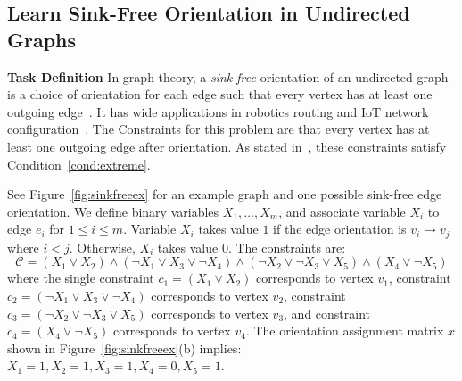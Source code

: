 \subsection{Learn Sink-Free Orientation in Undirected Graphs}
\textbf{Task Definition} In graph theory, a \textit{sink-free} orientation of an undirected graph is a choice of orientation for each edge such that every vertex has at least one outgoing edge~\cite{DBLP:journals/combinatorics/CohnPP02}. It has wide applications in robotics routing and IoT network configuration~\cite{takahashi2009communication}.  The Constraints for this problem are that every vertex has at least one outgoing edge after orientation. As stated in~\cite{DBLP:journals/jacm/GuoJL19}, these constraints satisfy Condition~\ref{cond:extreme}.

{See Figure~\ref{fig:sinkfreeex} for an example graph and one possible sink-free edge orientation. We define binary variables $X_1,\ldots, X_m$, and associate variable $X_i$ to edge $e_i$ for $1\le i\le m$. Variable $X_i$ takes value $1$ if the edge orientation is $v_i\to v_j$ where $i<j$. Otherwise, $X_i$ takes value $0$. The constraints are:}
\begin{equation*}
\mathcal{C}=(X_1\vee X_2)\wedge(\neg X_1\vee X_3\vee\neg X_4)\wedge(\neg X_2\vee\neg X_3\vee X_5)\wedge(X_4\vee \neg X_5)
\end{equation*}
{where the single constraint  $c_1=(X_1\vee X_2)$ corresponds to vertex $v_1$, constraint $c_2=(\neg X_1\vee X_3\vee\neg X_4)$ corresponds to vertex  $v_2$, constraint $c_3=(\neg X_2\vee\neg X_3\vee X_5)$  corresponds to vertex  $v_3$, and constraint $c_4=(X_4\vee \neg X_5)$ corresponds to vertex  $v_4$. The orientation assignment matrix $x$ shown in Figure~\ref{fig:sinkfreeex}(b) implies: $X_1=1,X_2=1,X_3=1,X_4=0,X_5=1$.}

